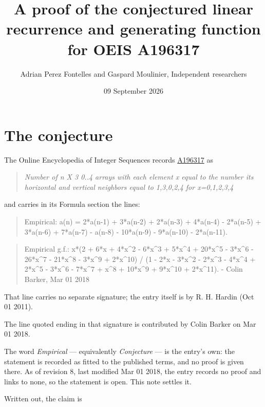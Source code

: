 \documentclass[11pt]{article}
\title{A proof of the conjectured linear recurrence and generating function for OEIS A196317}
\author{Adrian Perez Fontelles and Gaspard Moulinier, Independent researchers}
\date{09 September 2026}
\theoremstyle{definition}
\begin{document}
\maketitle
\section{The conjecture}

The Online Encyclopedia of Integer Sequences records \href{https://oeis.org/A196317}{A196317} as

\begin{quote}\itshape Number of n X 3 0..4 arrays with each element x equal to the number its horizontal and vertical neighbors equal to 1,3,0,2,4 for x=0,1,2,3,4\end{quote}

and carries in its Formula section the lines:

\begin{quote}\ttfamily Empirical: a(n) = 2*a(n-1) + 3*a(n-2) + 2*a(n-3) + 4*a(n-4) - 2*a(n-5) + 3*a(n-6) + 7*a(n-7) - a(n-8) - 10*a(n-9) - 9*a(n-10) - 2*a(n-11).\end{quote}

\begin{quote}\ttfamily Empirical g.f.: x*(2 + 6*x + 4*x\textasciicircum{}2 - 6*x\textasciicircum{}3 + 5*x\textasciicircum{}4 + 20*x\textasciicircum{}5 - 3*x\textasciicircum{}6 - 26*x\textasciicircum{}7 - 21*x\textasciicircum{}8 - 3*x\textasciicircum{}9 + 2*x\textasciicircum{}10) / (1 - 2*x - 3*x\textasciicircum{}2 - 2*x\textasciicircum{}3 - 4*x\textasciicircum{}4 + 2*x\textasciicircum{}5 - 3*x\textasciicircum{}6 - 7*x\textasciicircum{}7 + x\textasciicircum{}8 + 10*x\textasciicircum{}9 + 9*x\textasciicircum{}10 + 2*x\textasciicircum{}11). - Colin Barker, Mar 01 2018\end{quote}

That line carries no separate signature; the entry itself is by R. H. Hardin (Oct 01 2011).

The line quoted ending in that signature is contributed by Colin Barker on Mar 01 2018.

The word {\itshape Empirical} --- equivalently {\itshape Conjecture} --- is the entry's own: the statement is recorded as fitted to the published terms, and no proof is given there. As of revision 8, last modified Mar 01 2018, the entry records no proof and links to none, so the statement is open. This note settles it.

Written out, the claim is
\end{document}
